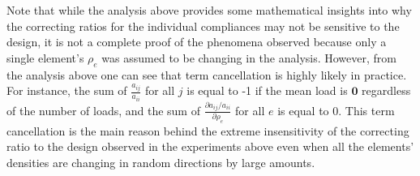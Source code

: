 Note that while the analysis above provides some mathematical insights into why the correcting ratios for the individual compliances may not be sensitive to the design, it is not a complete proof of the phenomena observed because only a single element's $\rho_e$ was assumed to be changing in the analysis. However, from the analysis above one can see that term cancellation is highly likely in practice. For instance, the sum of $\frac{a_{ij}}{a_{ii}}$ for all $j$ is equal to -1 if the mean load is $\bm{0}$ regardless of the number of loads, and the sum of $\frac{\partial a_{ij}/a_{ii}}{\partial \rho_e}$ for all $e$ is equal to 0. This term cancellation is the main reason behind the extreme insensitivity of the correcting ratio to the design observed in the experiments above even when all the elements' densities are changing in random directions by large amounts.

